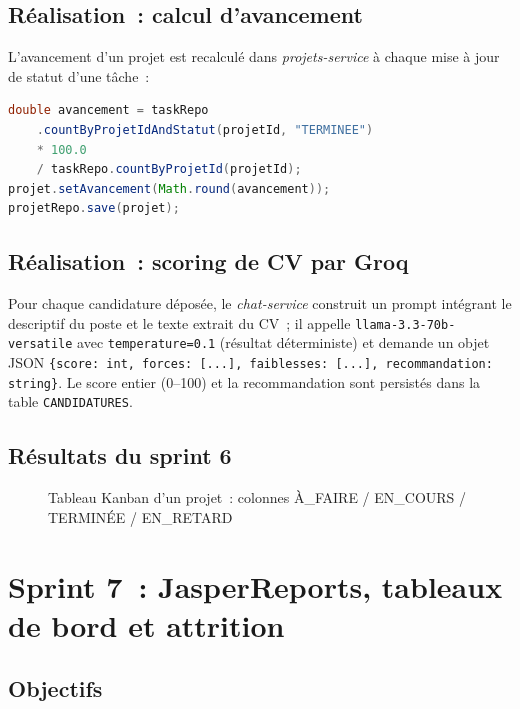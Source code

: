 \subsection{Réalisation~: calcul d'avancement}

L'avancement d'un projet est recalculé dans \textit{projets-service} à chaque
mise à jour de statut d'une tâche~:

\begin{lstlisting}[language=Java,caption={Calcul de l'avancement dans ProjetService}]
double avancement = taskRepo
    .countByProjetIdAndStatut(projetId, "TERMINEE")
    * 100.0
    / taskRepo.countByProjetId(projetId);
projet.setAvancement(Math.round(avancement));
projetRepo.save(projet);
\end{lstlisting}

\subsection{Réalisation~: scoring de CV par Groq}

Pour chaque candidature déposée, le \textit{chat-service} construit un prompt
intégrant le descriptif du poste et le texte extrait du CV~; il appelle
\texttt{llama-3.3-70b-versatile} avec \texttt{temperature=0.1} (résultat
déterministe) et demande un objet JSON \texttt{\{score: int, forces: [...],
faiblesses: [...], recommandation: string\}}. Le score entier (0--100) et la
recommandation sont persistés dans la table \texttt{CANDIDATURES}.

\subsection{Résultats du sprint 6}

\begin{figure}[H]
  \centering
  \caption{Tableau Kanban d'un projet~: colonnes À\_FAIRE / EN\_COURS / TERMINÉE / EN\_RETARD}
  \label{fig:s6_kanban}
\end{figure}

\section{Sprint 7~: JasperReports, tableaux de bord et attrition}

\subsection{Objectifs}

